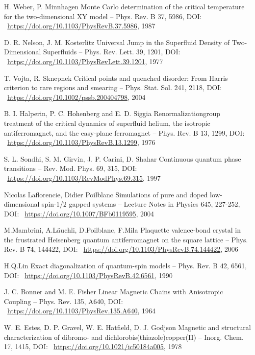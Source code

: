 \documentclass[11pt]{article}
\begin{document}
\begin{thebibliography}{3}
H. Weber, P. Minnhagen Monte Carlo determination of the critical temperature for the two-dimensional XY model -- Phys. Rev. B 37, 5986, DOI: ~\url{https://doi.org/10.1103/PhysRevB.37.5986}, 1987

D. R. Nelson, J. M. Kosterlitz Universal Jump in the Superfluid Density of Two-Dimensional Superfluids -- Phys. Rev. Lett. 39, 1201, DOI: ~\url{https://doi.org/10.1103/PhysRevLett.39.1201}, 1977

 T. Vojta, R. Sknepnek Critical points and quenched disorder: From Harris criterion to rare regions and smearing -- Phys. Stat. Sol. 241, 2118, DOI: ~\url{https://doi.org/10.1002/pssb.200404798}, 2004

B. I. Halperin, P. C. Hohenberg and E. D. Siggia Renormalizationgroup treatment of the critical dynamics of superfluid helium, the isotropic antiferromagnet, and the easy-plane ferromagnet -- Phys. Rev. B 13, 1299, DOI: ~\url{https://doi.org/10.1103/PhysRevB.13.1299}, 1976

S. L. Sondhi, S. M. Girvin, J. P. Carini, D. Shahar Continuous quantum phase transitions -- Rev. Mod. Phys. 69, 315, DOI: ~\url{https://doi.org/10.1103/RevModPhys.69.315}, 1997

Nicolas Laflorencie, Didier Poilblanc Simulations of pure and doped low-dimensional spin-1/2 gapped systems -- Lecture Notes in Physics 645, 227-252, DOI: ~\url{https://doi.org/10.1007/BFb0119595}, 2004

M.Mambrini, A.Läuchli, D.Poilblanc, F.Mila Plaquette valence-bond crystal in the frustrated Heisenberg quantum antiferromagnet on the square lattice -- Phys. Rev. B 74, 144422, DOI: ~\url{https://doi.org/10.1103/PhysRevB.74.144422}, 2006

H.Q.Lin Exact diagonalization of quantum-spin models -- Phys. Rev. B 42, 6561, DOI: ~\url{https://doi.org/10.1103/PhysRevB.42.6561}, 1990

J. C. Bonner and M. E. Fisher Linear Magnetic Chains with Anisotropic Coupling -- Phys. Rev. 135, A640, DOI: ~\url{https://doi.org/10.1103/PhysRev.135.A640}, 1964

W. E. Estes, D. P. Gravel, W. E. Hatfield, D. J. Godjson  Magnetic and structural characterization of dibromo- and dichlorobis(thiazole)copper(II) -- Inorg. Chem. 17, 1415, DOI: ~\url{https://doi.org/10.1021/ic50184a005}, 1978


\end{thebibliography}
\end{document}
